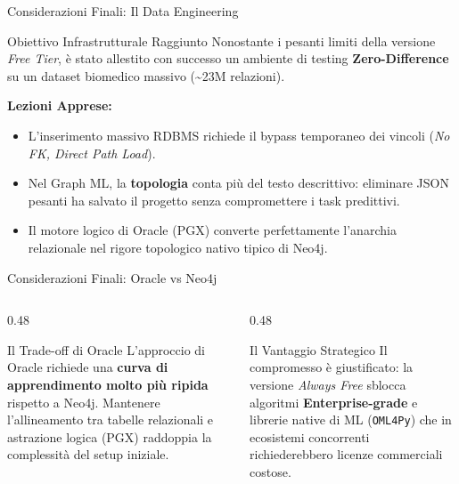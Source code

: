 \documentclass[aspectratio=169]{beamer}
\begin{document}
\begin{frame}{Considerazioni Finali: Il Data Engineering}
    \begin{block}{\faCheckSquare \hspace{0.2cm} Obiettivo Infrastrutturale Raggiunto}
        \small
        Nonostante i pesanti limiti della versione \textit{Free Tier}, è stato allestito con successo un ambiente di testing \textbf{Zero-Difference} su un dataset biomedico massivo (\textasciitilde 23M relazioni).
    \end{block}
    
    \vspace{0.3cm}
    \small
    \textbf{Lezioni Apprese:}
    \begin{itemize}
        \item[\faTractor] L'inserimento massivo RDBMS richiede il bypass temporaneo dei vincoli (\textit{No FK, Direct Path Load}).
        \item[\faBrain] Nel Graph ML, la \textbf{topologia} conta più del testo descrittivo: eliminare JSON pesanti ha salvato il progetto senza compromettere i task predittivi.
        \item[\faSearch] Il motore logico di Oracle (PGX) converte perfettamente l'anarchia relazionale nel rigore topologico nativo tipico di Neo4j.
    \end{itemize}
\end{frame}

\begin{frame}{Considerazioni Finali: Oracle vs Neo4j}
    \begin{columns}[T]
        \begin{column}{0.48\textwidth}
            \begin{alertblock}{\faBalanceScale \hspace{0.2cm} Il Trade-off di Oracle}
                \small
                L'approccio di Oracle richiede una \textbf{curva di apprendimento molto più ripida} rispetto a Neo4j. Mantenere l'allineamento tra tabelle relazionali e astrazione logica (PGX) raddoppia la complessità del setup iniziale.
            \end{alertblock}
        \end{column}
        
        \begin{column}{0.48\textwidth}
            \begin{exampleblock}{\faRocket \hspace{0.2cm} Il Vantaggio Strategico}
                \small
                Il compromesso è giustificato: la versione \textit{Always Free} sblocca algoritmi \textbf{Enterprise-grade} e librerie native di ML (\texttt{OML4Py}) che in ecosistemi concorrenti richiederebbero licenze commerciali costose.
            \end{exampleblock}
        \end{column}
    \end{columns}
\end{frame}
\end{document}
